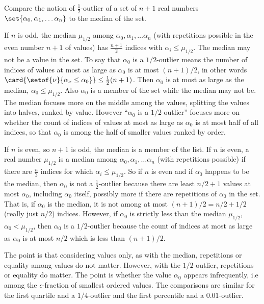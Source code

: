 \documentclass[12pt]{article}
\begin{document}
\begin{exercise}
    Compare the notion of \( \frac{1}{2} \)-outlier of a set of \( n+1 \)
    real numbers \( \set{\alpha_0, \alpha_1, \dots \alpha_n} \) to the
    median of the set.
\end{exercise}
\begin{solution}
    If \( n \) is odd, the median \( \mu_{1/2} \) among \( \alpha_0,
    \alpha_1, \dots \alpha_n \) (with repetitions possible in the even
    number \( n+1 \) of values) has \( \frac {n+1}{2} \) indices with
    \( \alpha_i \le \mu_{1/2} \).  The median may not be a value
    in the set.  To say that \( \alpha_0 \) is a \( 1/2 \)-outlier means
    the number of indices of values at most as large as \( \alpha_0 \)
    is at most \( (n+1)/2 \), in other words \( \card{%
    \setof{\nu}{\alpha_{\nu} \le \alpha_0}} \le \frac{1}{2}(n+1) \).
    Then \( \alpha_0 \) is at most as large as the median, \( \alpha_0
    \le \mu_{1/2} \).  Also \( \alpha_0 \) is a member of the set while
    the median may not be.  The median focuses more on the middle among
    the values, splitting the values into halves, ranked by value.
    However ``\( \alpha_0 \) is a \( 1/2 \)-outlier'' focuses more on
    whether the count of indices of values at most as large as \( \alpha_0
    \) is at most half of all indices, so that \( \alpha_0 \) is among
    the half of smaller values ranked by order.

    If \( n \) is even, so \( n + 1 \) is odd, the median is a member of
    the list.  If \( n \) is even, a real number \( \mu_{1/2} \) is a
    median among \( \alpha_0, \alpha_1, \dots \alpha_n \) (with
    repetitions possible) if there are \( \frac{n}{2} \) indices for
    which \( \alpha_i \le \mu_ {1/2} \).  So if \( n \) is even and if \(
    \alpha_0 \) happens to be the median, then \( \alpha_0 \) is not a \(
    \frac{1}{2} \)-outlier because there are least \( n/2 + 1 \)
    values at most \( \alpha_0 \), including \( \alpha_0 \) itself,
    possibly more if there are repetitions of \( \alpha_0 \) in the set.  That is, if \(
    \alpha_0 \) is the median, it is not among at most \( (n+1)/2 = n/2
    + 1/2 \) (really just \( n/2 \)) indices.  However, if \( \alpha_0 \)
    is strictly less than the median \( \mu_{1/2} \), \( \alpha_0 < \mu_{1/2}
    \), then \( \alpha_0 \) is a \( 1/2 \)-outlier because the count of
    indices at most as large as \( \alpha_0 \) is at most \( n/2 \)
    which is less than \( (n+1)/2 \).

    The point is that considering values only, as with the median,
    repetitions or equality among values do not matter.  However, with
    the \( 1/2 \)-outlier, repetitions or equality do matter.  The point
    is whether the value \( \alpha_0 \) appears infrequently, i.e among
    the \( \epsilon \)-fraction of smallest ordered values. The
    comparisons are similar for the first quartile and a \( 1/4 \)-outlier
    and the first percentile and a \( 0.01 \)-outlier.
\end{solution}
\end{document}
